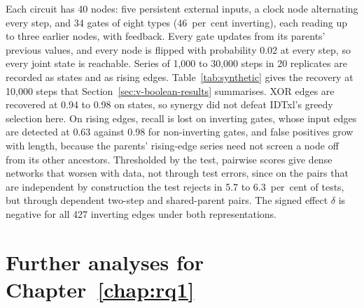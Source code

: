 Each circuit has 40 nodes: five persistent external inputs, a clock node alternating every step, and 34 gates of eight types (46~per~cent inverting), each reading up to three earlier nodes, with feedback. Every gate updates from its parents' previous values, and every node is flipped with probability 0.02 at every step, so every joint state is reachable. Series of 1,000 to 30,000 steps in 20 replicates are recorded as states and as rising edges. Table~\ref{tab:synthetic} gives the recovery at 10,000 steps that Section~\ref{sec:v-boolean-results} summarises. XOR edges are recovered at 0.94 to 0.98 on states, so synergy did not defeat IDTxl's greedy selection here. On rising edges, recall is lost on inverting gates, whose input edges are detected at 0.63 against 0.98 for non-inverting gates, and false positives grow with length, because the parents' rising-edge series need not screen a node off from its other ancestors. Thresholded by the test, pairwise scores give dense networks that worsen with data, not through test errors, since on the pairs that are independent by construction the test rejects in 5.7 to 6.3~per~cent of tests, but through dependent two-step and shared-parent pairs. The signed effect $\delta$ is negative for all 427 inverting edges under both representations.



\section{Further analyses for Chapter~\ref{chap:rq1}}

